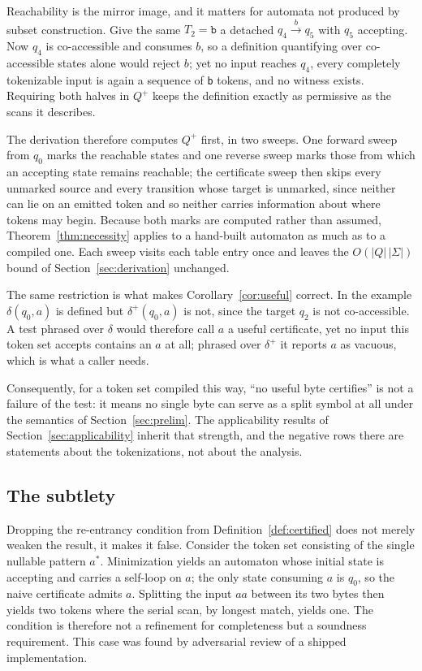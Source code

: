 \documentclass[11pt,a4paper]{article}
\theoremstyle{definition}
\theoremstyle{plain}
\newcommand{\code}[1]{\texttt{#1}}
\begin{document}
Reachability is the mirror image, and it matters for automata not produced by subset construction. Give the same $T_2
= \code{b}$ a detached $q_4 \xrightarrow{b} q_5$ with $q_5$ accepting. Now $q_4$ is co-accessible and consumes $b$, so
a definition quantifying over co-accessible states alone would reject $b$; yet no input reaches $q_4$, every
completely tokenizable input is again a sequence of \code{b} tokens, and no witness exists. Requiring both halves in
$Q^+$ keeps the definition exactly as permissive as the scans it describes.

The derivation therefore computes $Q^+$ first, in two sweeps. One forward sweep from $q_0$ marks the reachable states
and one reverse sweep marks those from which an accepting state remains reachable; the certificate sweep then skips
every unmarked source and every transition whose target is unmarked, since neither can lie on an emitted token and so
neither carries information about where tokens may begin. Because both marks are computed rather than assumed,
Theorem~\ref{thm:necessity} applies to a hand-built automaton as much as to a compiled one. Each sweep visits each
table entry once and leaves the $O(|Q|\,|\Sigma|)$ bound of Section~\ref{sec:derivation} unchanged.

The same restriction is what makes Corollary~\ref{cor:useful} correct. In the example $\delta(q_0, a)$ is defined but
$\delta^+(q_0, a)$ is not, since the target $q_2$ is not co-accessible. A test phrased over $\delta$ would therefore
call $a$ a useful certificate, yet no input this token set accepts contains an $a$ at all; phrased over $\delta^+$ it
reports $a$ as vacuous, which is what a caller needs.

Consequently, for a token set compiled this way, ``no useful byte certifies'' is not a failure of the test: it means no
single byte can serve as a split symbol at all under the semantics of Section~\ref{sec:prelim}. The applicability
results of Section~\ref{sec:applicability} inherit that strength, and the negative rows there are statements about the
tokenizations, not about the analysis.

\subsection{The subtlety}
\label{sec:subtlety}

Dropping the re-entrancy condition from Definition~\ref{def:certified} does not merely weaken the result, it makes it
false. Consider the token set consisting of the single nullable pattern $a^*$. Minimization yields an automaton whose
initial state is accepting and carries a self-loop on $a$; the only state consuming $a$ is $q_0$, so the naive
certificate admits $a$. Splitting the input $aa$ between its two bytes then yields two tokens where the serial scan,
by longest match, yields one. The condition is therefore not a refinement for completeness but a soundness
requirement. This case was found by adversarial review of a shipped implementation.
\end{document}
